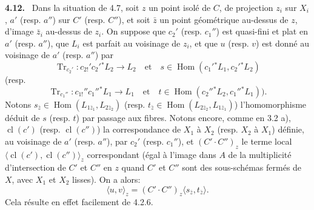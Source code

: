 \documentclass[11pt]{article}
\newenvironment{statement}[1]{\par\medskip\noindent\textbf{#1.}\ }{\par\medskip}
\DeclareMathOperator{\Hom}{Hom}
\providecommand{\cl}{\operatorname{cl}}
\providecommand{\Tr}{\operatorname{Tr}}
\providecommand{\Tr}{\operatorname{Tr}}
\providecommand{\Tr}{\operatorname{Tr}}
\providecommand{\Hom}{\operatorname{Hom}}
\providecommand{\Tr}{\operatorname{Tr}}
\providecommand{\cl}{\operatorname{cl}}
\providecommand{\Hom}{\operatorname{Hom}}
\providecommand{\cl}{\operatorname{cl}}
\providecommand{\Tr}{\operatorname{Tr}}
\begin{document}
\begin{statement}{4.12}
Dans la situation de 4.7, soit $z$ un point isolé de $C$, de projection $z_i$ sur $X_i$, $a'$ (resp. $a''$) sur $C'$ (resp. $C''$), et soit $\bar z$ un point géométrique au-dessus de $z$, d'image $\bar z_i$ au-dessus de $z_i$. On suppose que $c_2'$ (resp. $c_1''$) est quasi-fini et plat en $a'$ (resp. $a''$), que $L_i$ est parfait au voisinage de $z_i$, et que $u$ (resp. $v$) est donné au voisinage de $a'$ (resp. $a''$) par
\[
\Tr_{c_2'}:c_{2!}'c_2'{}^*L_2\longrightarrow L_2
\quad\text{et}\quad
s\in\Hom(c_1'{}^*L_1,c_2'{}^*L_2)
\]
(resp.
\[
\Tr_{c_1''}:c_{1!}''c_1''{}^*L_1\longrightarrow L_1
\quad\text{et}\quad
t\in\Hom(c_2''{}^*L_2,c_1''{}^*L_1)).
\]
Notons $s_{\bar z}\in\Hom(L_{1\bar z_1},L_{2\bar z_2})$ (resp. $t_{\bar z}\in\Hom(L_{2\bar z_2},L_{1\bar z_1})$) l'homomorphisme déduit de $s$ (resp. $t$) par passage aux fibres. Notons encore, comme en 3.2 a), $\cl(c')$ (resp. $\cl(c'')$) la correspondance de $X_1$ à $X_2$ (resp. $X_2$ à $X_1$) définie, au voisinage de $a'$ (resp. $a''$), par $c_2'$ (resp. $c_1''$), et $(C'\!\cdot C'')_z$ le terme local $\langle\cl(c'),\cl(c'')\rangle_z$ correspondant (égal à l'image dans $A$ de la multiplicité d'intersection de $C'$ et $C''$ en $z$ quand $C'$ et $C''$ sont des sous-schémas fermés de $X$, avec $X_1$ et $X_2$ lisses). On a alors:
\begin{equation}
\tag{4.12.1}
\langle u,v\rangle_z=(C'\!\cdot C'')_z\langle s_{\bar z},t_{\bar z}\rangle.
\end{equation}
Cela résulte en effet facilement de 4.2.6.
\end{statement}
\end{document}
